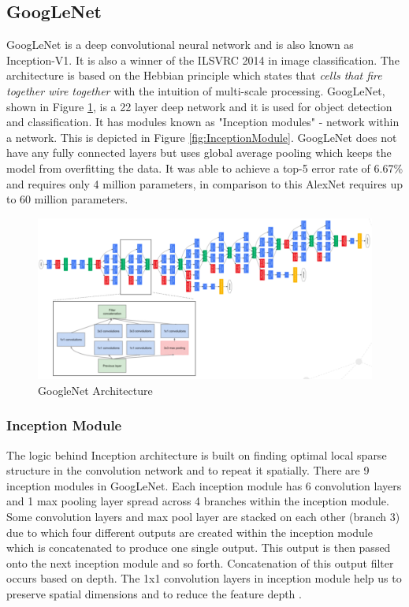 \subsection{GoogLeNet}\label{GoogLeNet_Topo}
GoogLeNet is a deep convolutional neural network and is also known as Inception-V1. It is also a winner of the ILSVRC 2014 in image classification. The architecture is based on the Hebbian principle which states that \textit{cells that fire together wire together} with the intuition of multi-scale  processing\cite{DBLP:journals/corr/SzegedyLJSRAEVR14}. GoogLeNet, shown in Figure \ref{fig:GoogLeNetTopo}, is a 22 layer deep network and it is used for object detection and classification. It has modules known as "Inception modules" - network within a network. This is depicted in Figure \ref{fig:InceptionModule}. GoogLeNet does not have any fully connected layers but uses global average pooling which keeps the model from overfitting the data. It was able to achieve a top-5 error rate of 6.67\% and requires only 4 million parameters, in comparison to this AlexNet requires up to 60 million parameters.

\begin{figure}[!h]
    \centering
    \includegraphics[scale=0.4]{img/googlenetarch.png}
    \caption{GoogleNet Architecture \cite{DBLP:journals/corr/SzegedyLJSRAEVR14}}
    \label{fig:GoogLeNetTopo}
\end{figure}

\subsubsection{Inception Module}
The logic behind Inception architecture is built on finding optimal local sparse structure in the convolution network and to repeat it spatially. There are 9 inception modules in GoogLeNet. Each inception module has 6 convolution layers and 1 max pooling layer spread across 4 branches within the inception module. Some convolution layers and max pool layer are stacked on each other (branch 3) due to which four different outputs are created within the inception module which is concatenated to produce one single output. This output is then passed onto the next inception module and so forth. Concatenation of this output filter occurs based on depth. The 1x1 convolution layers in inception module help us to preserve spatial dimensions and to reduce the feature depth \cite{DBLP:journals/corr/SzegedyLJSRAEVR14}.

